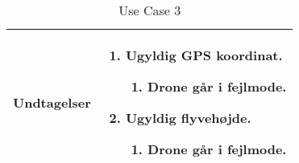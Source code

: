 \begin{table}[H]
\begin{tabular}{| p{3cm}| p{11.5cm}|}
Undtagelser							& 

									\renewcommand{\labelenumi}{\Roman{enumi}:}
									\renewcommand{\labelenumii}{\alph{enumii})}
									\begin{enumerate}[topsep=0.0cm,leftmargin=0.5cm]
										\item Ugyldig GPS koordinat.
											\begin{enumerate}[topsep=0cm, leftmargin=1cm]
												\item Drone går i fejlmode.
											\end{enumerate}
										\item Ugyldig flyvehøjde.
											\begin{enumerate}[topsep=0cm, leftmargin=1cm]
												\item Drone går i fejlmode.
											\end{enumerate}
									\end{enumerate} \\\hline	

\end{tabular}
\caption{Use Case 3}
\label{tab:UC3}
\end{table}